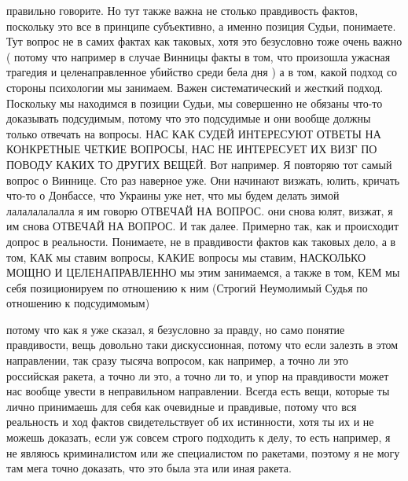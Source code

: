 правильно говорите. Но тут также важна не столько правдивость фактов, поскольку
это все в принципе субъективно, а именно позиция Судьи, понимаете. Тут вопрос
не в самих фактах как таковых, хотя это безусловно тоже очень важно ( потому
что например в случае Винницы факты в том, что произошла ужасная трагедия и
целенаправленное убийство среди бела дня ) а в том, какой подход со стороны
психологии мы занимаем. Важен систематический и жесткий подход. Поскольку мы
находимся в позиции Судьи, мы совершенно не обязаны что-то доказывать
подсудимым, потому что это подсудимые и они вообще должны только отвечать на
вопросы. НАС КАК СУДЕЙ ИНТЕРЕСУЮТ ОТВЕТЫ НА КОНКРЕТНЫЕ ЧЕТКИЕ ВОПРОСЫ, НАС НЕ
ИНТЕРЕСУЕТ ИХ ВИЗГ ПО ПОВОДУ КАКИХ ТО ДРУГИХ ВЕЩЕЙ. Вот например. Я повторяю
тот самый вопрос о Виннице. Сто раз наверное уже. Они начинают визжать, юлить,
кричать что-то о Донбассе, что Украины уже нет, что мы будем делать зимой
лалалалалалла я им говорю ОТВЕЧАЙ НА ВОПРОС. они снова юлят, визжат, я им снова
ОТВЕЧАЙ НА ВОПРОС. И так далее. Примерно так, как и происходит допрос в
реальности. Понимаете, не в правдивости фактов как таковых дело, а в том, КАК
мы ставим вопросы, КАКИЕ вопросы мы ставим, НАСКОЛЬКО МОЩНО И ЦЕЛЕНАПРАВЛЕННО
мы этим занимаемся, а также в том, КЕМ мы себя позиционируем по отношению к ним
(Строгий Неумолимый Судья по отношению к подсудимомым)

потому что как я уже сказал, я безусловно за правду, но само понятие
правдивости, вещь довольно таки дискуссионная, потому что если залезть в этом
направлении, так сразу тысяча вопросом, как например, а точно ли это российская
ракета, а точно ли это, а точно ли то, и упор на правдивости может нас вообще
увести в неправильном направлении. Всегда есть вещи, которые ты лично
принимаешь для себя как очевидные и правдивые, потому что вся реальность и ход
фактов свидетельствует об их истинности, хотя ты их и не можешь доказать, если
уж совсем строго подходить к делу, то есть например, я не являюсь криминалистом
или же специалистом по ракетами, поэтому я не могу там мега точно доказать, что
это была эта или иная ракета.
